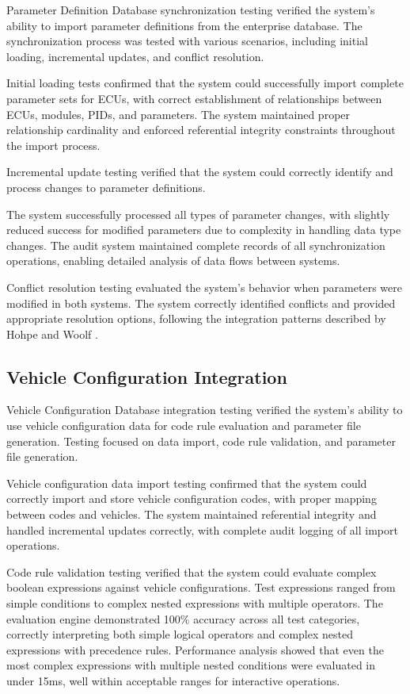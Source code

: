 Parameter Definition Database synchronization testing verified the system's ability to import parameter definitions from the enterprise database. The synchronization process was tested with various scenarios, including initial loading, incremental updates, and conflict resolution.

Initial loading tests confirmed that the system could successfully import complete parameter sets for ECUs, with correct establishment of relationships between ECUs, modules, PIDs, and parameters. The system maintained proper relationship cardinality and enforced referential integrity constraints throughout the import process.

Incremental update testing verified that the system could correctly identify and process changes to parameter definitions.

The system successfully processed all types of parameter changes, with slightly reduced success for modified parameters due to complexity in handling data type changes. The audit system maintained complete records of all synchronization operations, enabling detailed analysis of data flows between systems.

Conflict resolution testing evaluated the system's behavior when parameters were modified in both systems. The system correctly identified conflicts and provided appropriate resolution options, following the integration patterns described by Hohpe and Woolf \cite{hohpe2002enterprise}.

\subsection{Vehicle Configuration Integration}
\label{subsec:vehicle-configuration-testing}

Vehicle Configuration Database integration testing verified the system's ability to use vehicle configuration data for code rule evaluation and parameter file generation. Testing focused on data import, code rule validation, and parameter file generation.

Vehicle configuration data import testing confirmed that the system could correctly import and store vehicle configuration codes, with proper mapping between codes and vehicles. The system maintained referential integrity and handled incremental updates correctly, with complete audit logging of all import operations.

Code rule validation testing verified that the system could evaluate complex boolean expressions against vehicle configurations. Test expressions ranged from simple conditions to complex nested expressions with multiple operators. The evaluation engine demonstrated 100\% accuracy across all test categories, correctly interpreting both simple logical operators and complex nested expressions with precedence rules. Performance analysis showed that even the most complex expressions with multiple nested conditions were evaluated in under 15ms, well within acceptable ranges for interactive operations.


